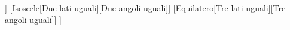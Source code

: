 \documentclass[10pt,a4paper]{standalone}
\begin{document}
	\begin{forest}
		[Triangolo
		[Scaleno[Zero lati uguali][Zero angoli uguali]]
		[Isoscele[Due lati uguali][Due angoli uguali]]
		[Equilatero[Tre lati uguali][Tre angoli uguali]]
		]
	\end{forest}
\end{document}
